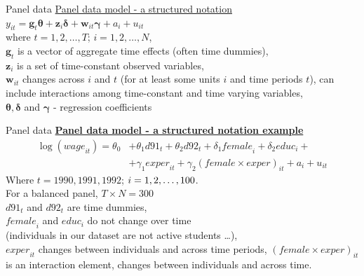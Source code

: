 \documentclass[usenames,dvipsnames]{beamer}
\newcommand{\mytikzmark}[2]{%
  \tikz[remember picture,inner sep=0pt,outer sep=0pt,baseline,anchor=base] 
    \node (#1) {\ensuremath{#2}};}
\begin{document}
\begin{frame}{Panel data}
\underline{Panel data model - a structured notation } \\
\medskip
$y_{it} = \bm{g}_t \bm{\theta} + \bm{z}_i \bm{\delta} + \bm{w}_{it} \bm{\gamma} + a_i + u_{it}$ \\
\medskip
where $t = 1, 2, \dots, T$; \quad $i = 1,2, \dots, N$,  \\
\medskip
$\bm{g}_t$ is a vector of aggregate time effects (often time dummies),\\
\medskip
$\bm{z}_i$ is a set of time-constant observed variables, \\
\medskip
$\bm{w}_{it}$ changes across $i$ and $t$ (for at least some units $i$ and time periods $t$), can include interactions among time-constant and time varying variables, \\
\medskip
$\bm{\theta, \delta}$ and $\bm{\gamma}$ - regression coefficients 
\end{frame}
\begin{frame}{Panel data}
\textbf{\underline{Panel data model - a structured notation example}} \\
\begin{align*}
\log(\textit{wage}_{it}) = \theta_0 & + \theta_1 d91_t + \theta_2 d92_t + \delta_1 \textit{female}_i + \delta_2 \textit{educ}_i +\\
& + \gamma_1 \textit{exper}_{it} + \gamma_2 (\textit{female} \times \textit{exper})_{it} + a_i + u_{it}
\end{align*}
Where $t = 1990, 1991, 1992$; \quad $i = 1, 2, \dots , \mytikzmark{100}{100}$. \\
For a balanced panel, $T \times N = 300$ \\
\vspace{0.2cm}
$d91_t$ and $d92_t$ are time dummies, \\
$\textit{female}_i$ and $\textit{educ}_i$ do not change over time \\(individuals in our dataset are not active students \dots ), \\
$\textit{exper}_{it}$ changes between individuals and across time periods,
$(\textit{female} \times \textit{exper})_{it}$ is an interaction element, changes between individuals and across time.
\end{frame}
\end{document}

